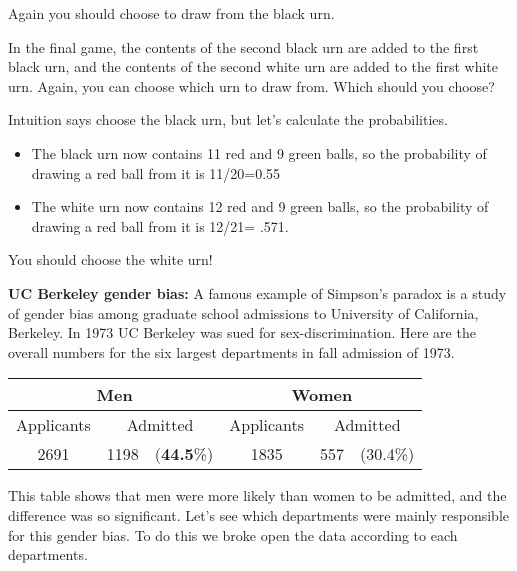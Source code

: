 Again you should choose to draw from the black urn.

In the final game, the contents of the second black urn are added to
the first black urn, and the contents of the second white urn are
added to the first white urn. Again, you can choose which urn to draw
from. Which should you choose?

Intuition says choose the black urn, but let's calculate the
probabilities.

\begin{itemize}
\item The black urn now contains 11 red and 9 green balls, so the
  probability of drawing a red ball from it is 11/20=0.55
\item The white urn now contains 12 red and 9 green balls, so the
  probability of drawing a red ball from it is 12/21= .571.
\end{itemize}

You should choose the white urn!

\textbf{UC Berkeley gender bias:} A famous example of Simpson's
paradox is a study of gender bias among graduate school admissions to
University of California, Berkeley. In 1973 UC Berkeley was sued for
sex-discrimination. Here are the overall numbers for the six largest
departments in fall admission of 1973.

\begin{table}
  \centering
\begin{tabular}{crrcrr}\hline
 \multicolumn{3}{c}{Men} & \multicolumn{3}{c}{Women} \\\hline
 Applicants & \multicolumn{2}{c}{Admitted} & Applicants & \multicolumn{2}{c}{Admitted} \\\hline
 2691 & 1198 & ({\bf 44.5}\%) & 1835 & 557 & (30.4\%) \\\hline
\end{tabular}
\end{table}

This table shows that men were more likely than women to be admitted,
and the difference was so significant. Let's see which departments
were mainly responsible for this gender bias. To do this we broke open
the data according to each departments.

